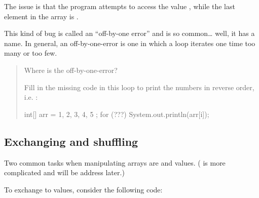 \documentclass[letterpaper,10pt,english,openany,oneside]{sphinxmanual}
\begin{document}
The issue is that the program attempts to access the value , while the last element in the array is .

This kind of bug is called an “off-by-one error” and is so common… well, it has a name. In general, an off-by-one-error is one in which a loop iterates one time too many or too few.
\begin{quote}

 Where is the off-by-one-error?

\begin{sphinxVerbatim}[commandchars=\\\{\}]
\PYG{p}{[}\PYG{p}{]}    \PYG{p}{[}\PYG{p}{]}
         
    \PYG{p}{[}\PYG{p}{]}
\end{sphinxVerbatim}

 Fill in the missing code in this  loop to print the numbers in reverse order, i.e. :

\begin{sphinxVerbatim}[commandchars=\\\{\}]
int[] arr = \PYGZob{} 1, 2, 3, 4, 5 \PYGZcb{};
for (???) \PYGZob{}
    System.out.println(arr[i]);
\PYGZcb{}
\end{sphinxVerbatim}
\end{quote}


\subsection{Exchanging and shuffling}
\label{\detokenize{arrays-arraylists:exchanging-and-shuffling}}
Two common tasks when manipulating arrays are  and  values. ( is more complicated and will be address later.)

To exchange to values, consider the following code:
\end{document}
